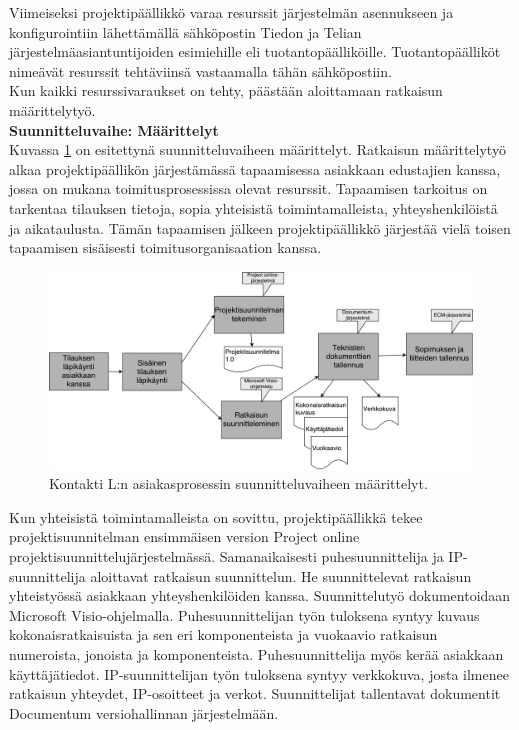 \documentclass[finnish,12pt,a4paper,pdftex]{article}
\begin{document}
Viimeiseksi projektipäällikkö varaa resurssit järjestelmän asennukseen ja konfigurointiin lähettämällä sähköpostin Tiedon ja Telian järjestelmäasiantuntijoiden esimiehille eli tuotantopäälliköille. Tuotantopäälliköt nimeävät resurssit tehtäviinsä vastaamalla tähän sähköpostiin.\\

Kun kaikki resurssivaraukset on tehty, päästään aloittamaan ratkaisun määrittelytyö.\\

\textbf{Suunnitteluvaihe: Määrittelyt}\\

Kuvassa \ref{fig:maarittely} on esitettynä suunnitteluvaiheen määrittelyt. Ratkaisun määrittelytyö alkaa projektipäällikön järjestämässä tapaamisessa asiakkaan edustajien kanssa, jossa on mukana toimitusprosessissa olevat resurssit. Tapaamisen tarkoitus on tarkentaa tilauksen tietoja, sopia yhteisistä toimintamalleista, yhteyshenkilöistä ja aikataulusta. Tämän tapaamisen jälkeen projektipäällikkö järjestää vielä toisen tapaamisen sisäisesti toimitusorganisaation kanssa.\\

\begin{figure}[!h]
    \centering
    \includegraphics[scale=0.25]{images/maarittely.pdf}
    \caption{Kontakti L:n asiakasprosessin suunnitteluvaiheen määrittelyt.}
    \label{fig:maarittely}
\end{figure}

Kun yhteisistä toimintamalleista on sovittu, projektipäällikkä tekee projektisuunnitelman ensimmäisen version Project online projektisuunnittelujärjestelmässä. Samanaikaisesti puhesuunnittelija ja IP-suunnittelija aloittavat ratkaisun suunnittelun. He suunnittelevat ratkaisun yhteistyössä asiakkaan yhteyshenkilöiden kanssa. Suunnittelutyö dokumentoidaan Microsoft Visio-ohjelmalla. Puhesuunnittelijan työn tuloksena syntyy kuvaus kokonaisratkaisuista ja sen eri komponenteista ja vuokaavio ratkaisun numeroista, jonoista ja komponenteista. Puhesuunnittelija myös kerää asiakkaan käyttäjätiedot. IP-suunnittelijan työn tuloksena syntyy verkkokuva, josta ilmenee ratkaisun yhteydet, IP-osoitteet ja verkot. Suunnittelijat tallentavat dokumentit Documentum versiohallinnan järjestelmään.\\
\end{document}
